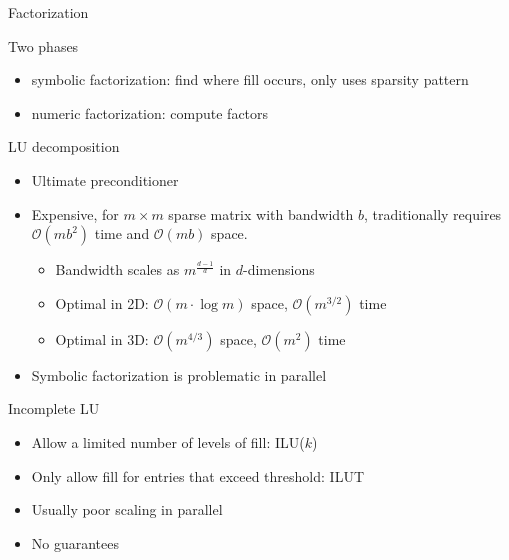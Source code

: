 \begin{frame}[shrink=5]{Factorization}
  \begin{block}{Two phases}
  \begin{itemize}
  \item symbolic factorization: find where fill occurs, only uses sparsity pattern
  \item numeric factorization: compute factors
  \end{itemize}
  \end{block}
  
  
  \begin{block}{LU decomposition}
    \begin{itemize}
    \item Ultimate preconditioner
    \item Expensive, for $m\times m$ sparse matrix with bandwidth $b$, traditionally requires $\mathcal{O}(mb^2)$ time and $\mathcal{O}(mb)$ space.
      \begin{itemize}
      \item Bandwidth scales as $m^{\frac{d-1}{d}}$ in $d$-dimensions
      \item Optimal in 2D: $\mathcal{O}(m \cdot \log m)$ space, $\mathcal{O}(m^{3/2})$ time
      \item Optimal in 3D: $\mathcal{O}(m^{4/3})$ space, $\mathcal{O}(m^2)$ time
      \end{itemize}
    \item Symbolic factorization is problematic in parallel
    \end{itemize}
  \end{block}
  \begin{block}{Incomplete LU}
    \begin{itemize}
    \item Allow a limited number of levels of fill:
      ILU($k$)
    \item Only allow fill for entries that exceed threshold: ILUT
    \item Usually poor scaling in parallel
    \item No guarantees
    \end{itemize}
  \end{block}
\end{frame}

